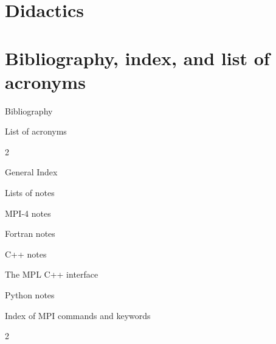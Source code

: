 \documentclass[11pt,letterpaper,twoside,openany]{boek3}
\begin{document}
\part{Didactics}




\part {Bibliography, index, and list of acronyms}

 {Bibliography}



\vfill\pagebreak

 {List of acronyms}

\def\acitem#1#2{\item[#1] #2}
\def\acitemi#1#2#3{\item[#1]{#2}\index{#1|see{#3}}}

\begin{multicols}{2}
\begin{description}

\end{description}
\end{multicols}

 {General Index}


\printindex

 {Lists of notes}

 {MPI-4 notes}

\listofmpifournote
\vfill\hbox{}

 {Fortran notes}

\listoffortrannote
\vfill\hbox{}

 {C++ notes}

\listofcppnote
\vfill\hbox{}

 {The MPL C++ interface}
\label{sec:idx:mpl}

\listofmplnote
\vfill\hbox{}

 {Python notes}

\listofpythonnote

 {Index of MPI commands and keywords}

\begin{multicols*}{2}
\printindex[mpi]
\end{multicols*}
\end{document}
